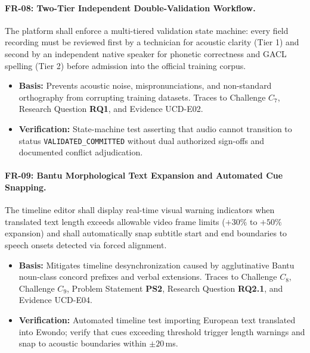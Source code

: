 \documentclass[conference]{IEEEtran}
\begin{document}
\paragraph{FR-08: Two-Tier Independent Double-Validation Workflow.}
The platform shall enforce a multi-tiered validation state machine: every field recording must be reviewed first by a technician for acoustic clarity (Tier 1) and second by an independent native speaker for phonetic correctness and GACL spelling (Tier 2) before admission into the official training corpus.
\begin{itemize}
    \item \textbf{Basis:} Prevents acoustic noise, mispronunciations, and non-standard orthography from corrupting training datasets. Traces to Challenge $C_7$, Research Question \textbf{RQ1}, and Evidence UCD-E02.
    \item \textbf{Verification:} State-machine test asserting that audio cannot transition to status \texttt{VALIDATED\_COMMITTED} without dual authorized sign-offs and documented conflict adjudication.
\end{itemize}

\paragraph{FR-09: Bantu Morphological Text Expansion and Automated Cue Snapping.}
The timeline editor shall display real-time visual warning indicators when translated text length exceeds allowable video frame limits ($+30\%$ to $+50\%$ expansion) and shall automatically snap subtitle start and end boundaries to speech onsets detected via forced alignment.
\begin{itemize}
    \item \textbf{Basis:} Mitigates timeline desynchronization caused by agglutinative Bantu noun-class concord prefixes and verbal extensions. Traces to Challenge $C_8$, Challenge $C_9$, Problem Statement \textbf{PS2}, Research Question \textbf{RQ2.1}, and Evidence UCD-E04.
    \item \textbf{Verification:} Automated timeline test importing European text translated into Ewondo; verify that cues exceeding threshold trigger length warnings and snap to acoustic boundaries within $\pm 20$\,ms.
\end{itemize}
\end{document}
